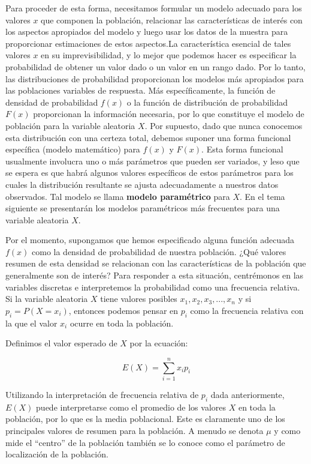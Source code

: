 \documentclass[
]{book}
\begin{document}
Para proceder de esta forma, necesitamos formular un modelo adecuado para los valores \(x\) que componen la población, relacionar las características de interés con los aspectos apropiados del modelo y luego usar los datos de la muestra para proporcionar estimaciones de estos aspectos.La característica esencial de tales valores \(x\) en su imprevisibilidad, y lo mejor que podemos hacer es especificar la probabilidad de obtener un valor dado o un valor en un rango dado. Por lo tanto, las distribuciones de probabilidad proporcionan los modelos más apropiados para las poblaciones variables de respuesta. Más específicamente, la función de densidad de probabilidad \(f(x)\) o la función de distribución de probabilidad \(F(x)\) proporcionan la información necesaria, por lo que constituye el modelo de población para la variable aleatoria \(X\). Por supuesto, dado que nunca conocemos esta distribución con una certeza total, debemos suponer una forma funcional específica (modelo matemático) para \(f(x)\) y \(F(x)\). Esta forma funcional usualmente involucra uno o más parámetros que pueden ser variados, y leso que se espera es que habrá algunos valores específicos de estos parámetros para los cuales la distribución resultante se ajusta adecuadamente a nuestros datos observados. Tal modelo se llama \textbf{modelo paramétrico} para \(X\). En el tema siguiente se presentarán los modelos paramétricos más frecuentes para una variable aleatoria \(X\).

Por el momento, supongamos que hemos especificado alguna función adecuada \(f(x)\) como la densidad de probabilidad de nuestra población. ¿Qué valores resumen de esta densidad se relacionan con las características de la población que generalmente son de interés? Para responder a esta situación, centrémonos en las variables discretas e interpretemos la probabilidad como una frecuencia relativa. Si la variable aleatoria \(X\) tiene valores posibles \(x_1, x_2, x_3, ... ,x_n\) y si \(p_i = P(X = x_i)\), entonces podemos pensar en \(p_i\) como la frecuencia relativa con la que el valor \(x_i\) ocurre en toda la población.

Definimos el valor esperado de \(X\) por la ecuación:

\begin{equation} 
  E(X) = \sum_{i=1}^n  x_i p_i
  \label{eq:espdisc}
\end{equation}

Utilizando la interpretación de frecuencia relativa de \(p_i\) dada anteriormente, \(E(X)\) puede interpretarse como el promedio de los valores \(X\) en toda la población, por lo que es la media poblacional. Este es claramente uno de los principales valores de resumen para la población. A menudo se denota \(\mu\) y como mide el ``centro'' de la población también se lo conoce como el parámetro de localización de la población.
\end{document}
